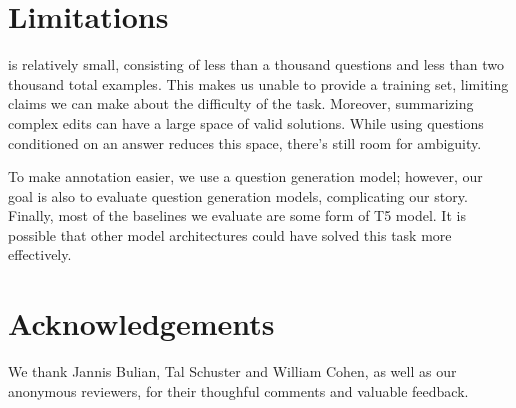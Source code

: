 \section*{Limitations}
\dataset{} is relatively small, consisting of less than a thousand questions and less than two thousand total examples. This makes us unable to provide a training set, limiting claims we can make about the difficulty of the task. Moreover, summarizing complex edits can have a large space of valid solutions. While using questions conditioned on an answer reduces this space, there's still room for ambiguity.

To make annotation easier, we use a question generation model; however, our goal is also to evaluate question generation models, complicating our story. Finally, most of the baselines we evaluate are some form of T5 \citep{raffel2020exploring} model. It is possible that other model architectures could have solved this task more effectively.

\section*{Acknowledgements}

We thank Jannis Bulian, Tal Schuster and William Cohen, as well as our anonymous reviewers, for their thoughful comments and valuable feedback.